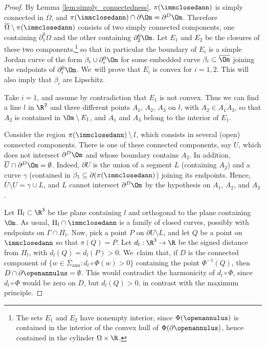 \begin{proof}
By Lemma \ref{lem:simply_connectedness}, $\pi(\immclosedann)$ is
simply connected in $\overline\Omega$, and $\pi(\immclosedann)\cap \partial\Om=\partial^D\Om$.
Therefore $\overline\Omega\setminus \pi(\immclosedann)$ consists of two simply connected components, one containing $\partial_1^0\Omega$ and the other containing $\partial_2^0\Om$.
Let $E_1$ and $E_2$ be the closures of these two components,\footnote{The sets $E_1$ and $E_2$ have nonempty interior, since $\Phi(\openannulus)$ is contained in the interior of the convex hull of $\Phi(\partial\openannulus)$, hence contained in the cylinder $\Omega\times\R$.}
so that in particular the boundary of $E_i$ is a
simple Jordan curve
of the form $ \beta_i\cup\partial_i^0\Om$ for some
embedded curve $\beta_i\subset\overline\Om$ joining the endpoints of $\partial_i^0\Om$. We~will prove that $E_i$ is convex for $i=1,2$.
This will also imply that $\beta_i$ are Lipschitz.

Take $i=1$, and assume by contradiction that $E_1$ is not convex.
Thus we can find a line $l$ in $\R^2$ and three different points $A_1$, $A_2$, $A_3$ on $l$, with $A_2\in\overline{A_1A_3}$, so that $A_2$ is contained in $\Om\setminus E_1$, and $A_1$ and $A_3$ belong to the interior of $E_1$.

Consider the region $\pi(\immclosedann)\setminus l$, which consists in several (open) connected components. There is one of
these connected components, say $U$,
which does not intersect $\partial^D\Om$ and
whose boundary contains $A_2$. In addition,
$\overline U \cap \partial^D\Om = \emptyset$.
Indeed, $\partial U$ is the union of a segment $L$ (containing $A_2$) and a curve $\gamma$ (contained in $\beta_1\subseteq\partial (\pi(\immclosedann)$) joining its endpoints.
Hence, $\overline U\setminus U=\gamma\cup L$, and $L$ cannot intersect $\partial^D\Om$ by the hypothesis on $A_1$, $A_2$, and $A_3$.

Let $\Pi_l\subset\R^3$ be the
plane containing $l$ and
orthogonal to the plane containing $\Om$.
As usual, $\Pi_l\cap
\immclosedann$ is a family of closed curves, possibly with endpoints on $\Gamma\cap \Pi_l$.
Now, pick a point $P$ on $\partial U\setminus L$, and let $Q$ be a point on $\immclosedann$ so that $\pi(Q)=P$.
Let $d_l:\R^3\to \R$ be the signed distance from $\Pi_l$,
with $d_l(Q)=d_l(P)>0$. We~claim that, if $D$ is the connected component of $\{w\in
\overline\Sigma_\mathrm{ann}:d_l\circ\Phi(w)>0\}$ containing the point $\Phi^{-1}(Q)$, then $D\cap \partial\openannulus=\emptyset$.
This would contradict the harmonicity of $d_l\circ\Phi$, since $d_l\circ\Phi$ would be zero
on $D$, but $d_l(Q)>0$, in contrast with the maximum principle.


\end{proof}
